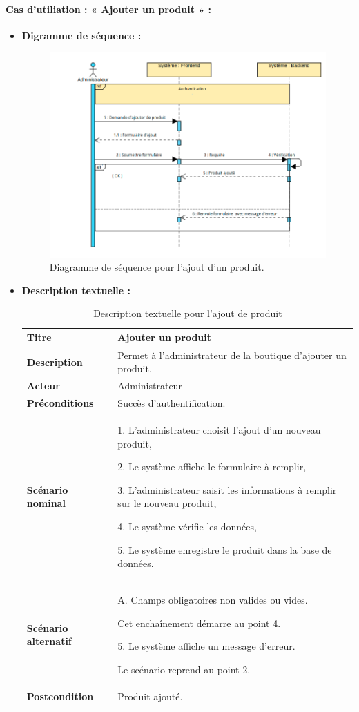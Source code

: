 \documentclass[a4paper, 12pt]{report}
\begin{document}
\paragraph{Cas d'utiliation : « Ajouter un produit » :}
\begin{itemize}
    \item \textbf{Digramme de séquence :}
    \begin{figure}[H]
    \centering
    \includegraphics[width = 1\linewidth]{img/sequence2.png}
    \caption{Diagramme de séquence pour l'ajout d'un produit.}
\end{figure}
    \item \textbf{Description textuelle :}
    \begin{table}[H]
\begin{tabular}{|p{4cm}|p{8cm}|} 
\hline  
\raggedright \textbf{Titre} & Ajouter un produit   \tabularnewline  
\hline
\raggedright \textbf{Description}  &  Permet à l'administrateur de la boutique d’ajouter un produit. \tabularnewline  
\hline  
\raggedright \textbf{Acteur}  &  Administrateur \tabularnewline 
\hline
\raggedright \textbf{Préconditions}  & Succès d’authentification.  \tabularnewline
\hline
\raggedright \textbf{Scénario nominal}  &  
1. L'administrateur choisit l’ajout d’un nouveau produit,


2. Le système affiche le formulaire à remplir,


3. L'administrateur saisit les informations à remplir sur le nouveau produit,


4. Le système vérifie les données,


5. Le système enregistre le produit dans la base de données.
\tabularnewline
\hline
\raggedright \textbf{Scénario alternatif} &  
A. Champs obligatoires non valides ou vides.


Cet enchaînement démarre au point 4.


5. Le système affiche un message d’erreur.


Le scénario reprend au point 2.
\tabularnewline
\hline
\raggedright \textbf{Postcondition} & Produit ajouté. \tabularnewline
\hline
\end{tabular}
\caption{Description textuelle pour l'ajout de produit}
\end{table}
\end{itemize}
\end{document}
